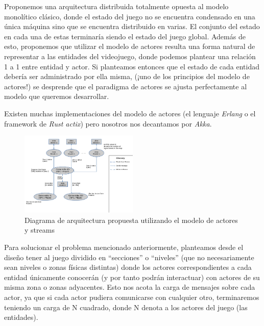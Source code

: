 
Proponemos una arquitectura distribuida totalmente opuesta al modelo monolítico clásico, 
donde el estado del juego no se encuentra condensado en una única máquina sino que se encuentra 
distribuido en varias. El conjunto del estado en cada una de estas terminaría siendo el 
estado del juego global. Además de esto, proponemos que utilizar el modelo de actores resulta 
una forma natural de representar a las entidades del videojuego, donde podemos plantear una 
relación 1 a 1 entre entidad y actor. Si planteamos entonces que el estado de cada entidad 
debería ser administrado por ella misma, (¡uno de los principios del modelo de actores!) 
se desprende que el paradigma de actores se ajusta perfectamente al modelo que queremos desarrollar.

Existen muchas implementaciones del modelo de actores (el lenguaje \textit{Erlang} o el framework de 
\textit{Rust actix}) pero nosotros nos decantamos por \textit{Akka}.


\begin{figure}[htbp]
    \centering
    \includegraphics[width=0.5\textwidth]{../assets/architecture.png}
    \caption{Diagrama de arquitectura propuesta utilizando el modelo de actores y streams}
\end{figure}

Para solucionar el problema mencionado anteriormente, planteamos desde el diseño tener al juego 
dividido en “secciones” o “niveles” (que no necesariamente sean niveles o zonas físicas distintas) 
donde los actores correspondientes a cada entidad únicamente conocerán (y por tanto podrán interactuar) 
con actores de su misma zona o zonas adyacentes. Esto nos acota la carga de mensajes sobre cada actor, 
ya que si cada actor pudiera comunicarse con cualquier otro, terminaremos teniendo un carga de 
N cuadrado, donde N denota a los actores del juego (las entidades).

